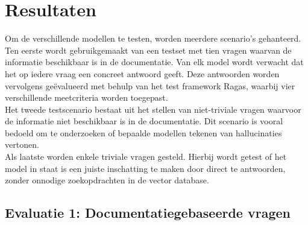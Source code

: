 
\chapter{Resultaten}
\label{ch:resultaten}

Om de verschillende modellen te testen, worden meerdere scenario’s gehanteerd.
Ten eerste wordt gebruikgemaakt van een testset met tien vragen waarvan de informatie beschikbaar is in de documentatie. Van elk model wordt verwacht dat het op iedere vraag een concreet antwoord geeft. Deze antwoorden worden vervolgens geëvalueerd met behulp van het test framework Ragas, waarbij vier verschillende meetcriteria worden toegepast.
\\[1em]
Het tweede testscenario bestaat uit het stellen van niet-triviale vragen waarvoor de informatie niet beschikbaar is in de documentatie. Dit scenario is vooral bedoeld om te onderzoeken of bepaalde modellen tekenen van hallucinaties vertonen.
\\[1em]
Als laatste worden enkele triviale vragen gesteld. Hierbij wordt getest of het model in staat is een juiste inschatting te maken door direct te antwoorden, zonder onnodige zoekopdrachten in de vector database.

\section{Evaluatie 1: Documentatiegebaseerde vragen}

